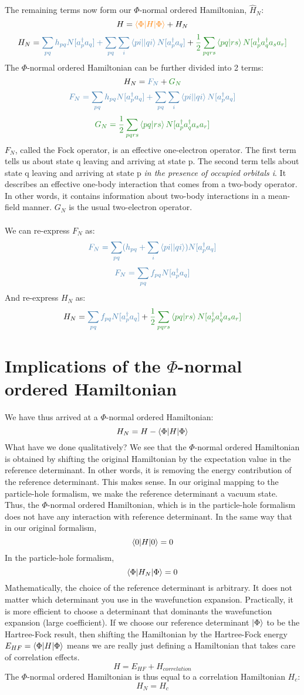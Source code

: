 \documentclass{article}
\newcommand{\kphi}{\ensuremath{\ket{\Phi}} }
\newcommand{\dg}{\ensuremath{^\dagger} }
\def\cb#1{{\color{blue}#1}}
\def\co#1{{\color{orange}#1}}
\def\cg#1{{\color{green}#1}}
\begin{document}
  The remaining terms now form our $\Phi$-normal ordered Hamiltonian, $\hat{H}_N$:
   \[H = \co{ \braket{\Phi |H|\Phi}} + H_N\]
   \[H_N = \cb{\sum_{pq}h_{pq} N[a_p\dg a_q]  +   \sum_{pq} \sum_i \braket{pi || qi}   N[ a_p\dg a_q]}
  + \cg{\frac{1}{2} \sum_{pqrs} \braket{pq | rs} N[a_p\dg a_q\dg a_s a_r]} \]
  The $\Phi$-normal ordered Hamiltonian can be further divided into 2 terms: 
     \[H_N = \cb{F_N} + \cg{G_N} \]
     \[  \cb{F_N = \sum_{pq}h_{pq} N[a_p\dg a_q]  +   \sum_{pq} \sum_i \braket{pi || qi}   N[ a_p\dg a_q]} \]
     \[ \cg{G_N = \frac{1}{2} \sum_{pqrs} \braket{pq | rs} N[a_p\dg a_q\dg a_s a_r]}\]
  $F_N$, called the Fock operator, is an effective one-electron operator.
  The first term tells us about state q leaving and arriving at state p. 
  The second term tells about state q leaving and arriving at state p \textit{in the presence of occupied orbitals i}. 
  It describes an effective one-body interaction that comes from a two-body operator.
  In other words, it contains information about two-body interactions in a mean-field manner. 
$G_N$ is the usual two-electron operator. 
\\ \\ 
We can re-express $F_N$ as: 
 \[  \cb{F_N = \sum_{pq} (h_{pq} + \sum_i \braket{pi || qi}  ) N[a_p\dg a_q] }  \]
  \[  \cb{F_N = \sum_{pq} f_{pq} N[a_p\dg a_q] } \]
  And re-express $H_N$ as: 
       \[H_N =  \cb{\sum_{pq} f_{pq} N[a_p\dg a_q] }  + \cg{ \frac{1}{2} \sum_{pqrs} \braket{pq | rs} N[a_p\dg a_q\dg a_s a_r] }\]
 \section{Implications of the $\Phi$-normal ordered Hamiltonian}
 We have thus arrived at a $\Phi$-normal ordered Hamiltonian:
 \[ H_N =  H-  \braket{\Phi |H|\Phi}\]
What have we done qualitatively? 
We see that the $\Phi$-normal ordered Hamiltonian is obtained by shifting the original Hamiltonian by the expectation value in the reference determinant. 
In other words, it is removing the energy contribution of the reference determinant. 
This makes sense. 
In our original mapping to the particle-hole formalism, we make the reference determinant a vacuum state. 
Thus, the $\Phi$-normal ordered Hamiltonian, which is in the particle-hole formalism does not have any interaction with reference determinant.
In the same way that in our original formalism,
\[\braket{0| H | 0} = 0\]
In the particle-hole formalism, 
\[\braket{\Phi| H_N | \Phi} = 0\]
 Mathematically, the choice of the reference determinant is arbitrary. It does not matter which determinant you use in the wavefunction expansion.
 Practically, it is more efficient to choose a determinant that dominants the wavefunction expansion (large coefficient). 
 If we choose our reference determinant \kphi to be the Hartree-Fock result, then shifting the Hamiltonian by the Hartree-Fock
 energy $E_{HF} = \braket{\Phi |H|\Phi}$ means we are really just defining a Hamiltonian that takes care of correlation effects. 
\[H = E_{HF} + H_{correlation} \]
 The $\Phi$-normal ordered Hamiltonian is thus equal to a correlation Hamiltonian $H_c$: 
 \[H_N = H_c \]
\end{document}
